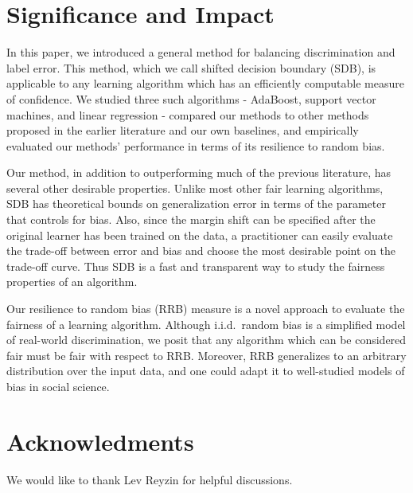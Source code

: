 \documentclass[twoside,leqno,twocolumn]{article}
\begin{document}
\section{Significance and Impact}\label{sec:discussion}
In this paper, we introduced a general method for balancing discrimination and
label error. This method, which we call shifted decision boundary (SDB), is
applicable to any learning algorithm which has an efficiently computable
measure of confidence. We studied three such algorithms - AdaBoost, support
vector machines, and linear regression - compared our methods to other methods
proposed in the earlier literature and our own baselines, and empirically
evaluated our methods' performance in terms of its resilience to random bias. 

Our method, in addition to outperforming much of the previous literature, has
several other desirable properties. Unlike most other fair learning algorithms,
SDB has theoretical bounds on generalization error in terms of the parameter
that controls for bias. Also, since the margin shift can be specified after the
original learner has been trained on the data, a practitioner can easily
evaluate the trade-off between error and bias and choose the most desirable
point on the trade-off curve. Thus SDB is a fast and transparent way to study
the fairness properties of an algorithm.

Our resilience to random bias (RRB) measure is a novel approach to evaluate the
fairness of a learning algorithm. Although i.i.d.~random bias is a simplified
model of real-world discrimination, we posit that any algorithm which can be
considered fair must be fair with respect to RRB. Moreover, RRB generalizes to
an arbitrary distribution over the input data, and one could adapt it to
well-studied models of bias in social science.

\section*{Acknowledments}
We would like to thank Lev Reyzin for helpful discussions.
\end{document}
